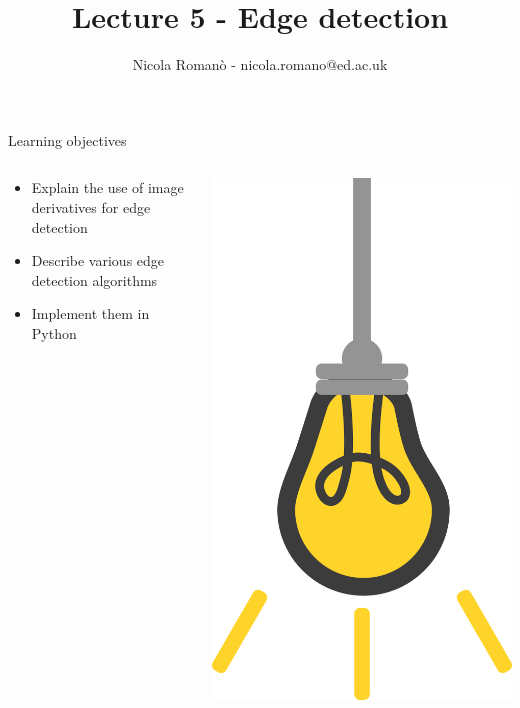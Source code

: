 \documentclass[9pt, aspectratio=169]{beamer}
\author{Nicola Roman\`o - nicola.romano@ed.ac.uk}
\title{Lecture 5 - Edge detection}
\date{}
\begin{document}

\begin{frame}
    \titlepage
\end{frame}

\begin{frame}
    {Learning objectives}
    \begin{columns}
        \begin{column}{0.8\textwidth}
            \begin{itemize}
                \item Explain the use of image derivatives for edge detection
                \item Describe various edge detection algorithms
                \item Implement them in Python
            \end{itemize}
        \end{column}
        \begin{column}{0.2\textwidth}
            \includegraphics[angle=-30, origin=tr, width=1.5\textwidth]{lightbulb.png}

\end{column}
\end{columns}
\end{frame}
\end{document}
